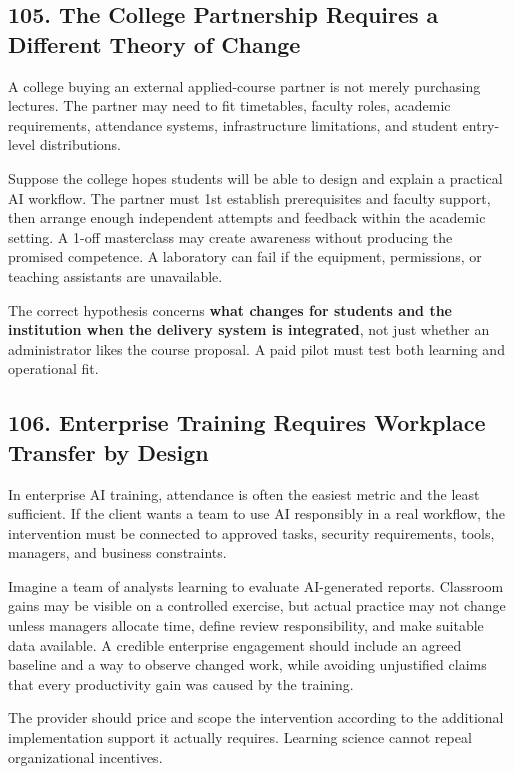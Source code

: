 \subsection*{105. The College Partnership Requires a Different Theory of Change}

A college buying an external applied-course partner is not merely purchasing lectures. The partner may need to fit timetables, faculty roles, academic requirements, attendance systems, infrastructure limitations, and student entry-level distributions.

Suppose the college hopes students will be able to design and explain a practical AI workflow. The partner must 1st establish prerequisites and faculty support, then arrange enough independent attempts and feedback within the academic setting. A 1-off masterclass may create awareness without producing the promised competence. A laboratory can fail if the equipment, permissions, or teaching assistants are unavailable.

The correct hypothesis concerns \textbf{what changes for students and the institution when the delivery system is integrated}, not just whether an administrator likes the course proposal. A paid pilot must test both learning and operational fit.

\subsection*{106. Enterprise Training Requires Workplace Transfer by Design}

In enterprise AI training, attendance is often the easiest metric and the least sufficient. If the client wants a team to use AI responsibly in a real workflow, the intervention must be connected to approved tasks, security requirements, tools, managers, and business constraints.

Imagine a team of analysts learning to evaluate AI-generated reports. Classroom gains may be visible on a controlled exercise, but actual practice may not change unless managers allocate time, define review responsibility, and make suitable data available. A credible enterprise engagement should include an agreed baseline and a way to observe changed work, while avoiding unjustified claims that every productivity gain was caused by the training.

The provider should price and scope the intervention according to the additional implementation support it actually requires. Learning science cannot repeal organizational incentives.

